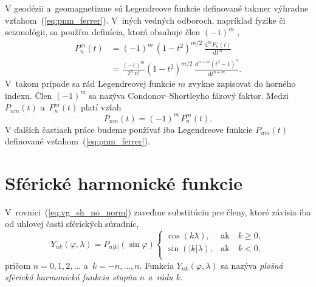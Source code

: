 \documentclass[a4paper,12pt]{book}
\newcommand{\diff}{\mathrm d}
\begin{document}
V geodézii a~geomagnetizme sú Legendreove funkcie definované takmer výhradne 
vzťahom~(\ref{eq:pnm_ferrer}).  V~iných vedných odboroch, napríklad fyzike či 
seizmológii, sa používa definícia, ktorá obsahuje člen $(-1)^m$ 
\parencite[pozri][]{Wieczorek2015,Olver2010},
%
\begin{equation}
\begin{split}
P_n^m(t) &= (-1)^m \, (1 - t^2)^{m \slash 2} \, \frac{\diff^m P_n(t)}{\diff 
t^m}\\
%
&= \frac{(-1)^m}{2^n \, n!} (1 - t^2)^{ m \slash 2} \, \frac{\diff^{n + m}
(t^2 - 1)^n}{\diff t^{n + m}}{.}
\end{split}
\end{equation}
%
V~takom prípade sa rád Legendreovej funkcie $m$ zvykne zapisovať do horného 
indexu.  Člen $(-1)^{m}$ sa nazýva Condonov--Shortleyho fázový faktor.  Medzi 
$P_{nm}(t)$ a~$P_n^m(t)$ platí vzťah
%
\begin{equation}
P_{nm}(t) = (-1)^m \, P_n^m(t){.}
\end{equation}
%
V ďalších častiach práce budeme používať iba Legendreove funkcie $P_{nm}(t)$ 
definované vzťahom~(\ref{eq:pnm_ferrer}).




\section{Sférické harmonické funkcie}
\label{sec:spherical_harmonics}

V~rovnici~(\ref{eq:vg_sh_no_norm}) zaveďme substitúciu pre členy, ktoré závisia
iba od uhlovej časti sférických súradníc,
%
\begin{equation}
\label{eq:ynk_no_norm}
Y_{nk}(\varphi, \lambda) = P_{n|k|}(\sin\varphi)
%
\begin{cases}
\cos(k\lambda){,}    &\text{ak} \quad k \geq 0{,}\\
\sin(|k|\lambda){,}  &\text{ak} \quad k < 0{,}\\
\end{cases}
\end{equation}
%
pričom $n = 0, 1, 2, \dots$ a~$k = -n, \dots, n$.  Funkcia $Y_{nk}(\varphi,
\lambda)$ sa nazýva \emph{plošná sférická harmonická funkcia stupňa $n$ a~rádu
$k$}.
\end{document}
